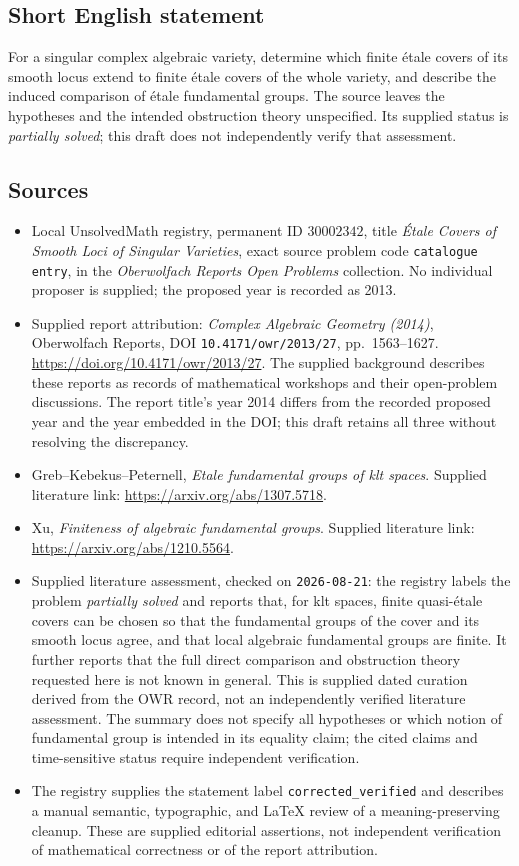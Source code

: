 \documentclass[11pt]{article}
\begin{document}
\subsection{Short English statement}
For a singular complex algebraic variety, determine which finite étale covers of its smooth locus extend to finite étale covers of the whole variety, and describe the induced comparison of étale fundamental groups. The source leaves the hypotheses and the intended obstruction theory unspecified. Its supplied status is \emph{partially solved}; this draft does not independently verify that assessment.
\subsection{Sources}
\begin{itemize}
\item Local UnsolvedMath registry, permanent ID \(30002342\), title \emph{Étale Covers of Smooth Loci of Singular Varieties}, exact source problem code \texttt{catalogue entry}, in the \emph{Oberwolfach Reports Open Problems} collection. No individual proposer is supplied; the proposed year is recorded as 2013.
\item Supplied report attribution: \emph{Complex Algebraic Geometry (2014)}, Oberwolfach Reports, DOI \texttt{10.4171/owr/2013/27}, pp.~1563--1627. \url{https://doi.org/10.4171/owr/2013/27}. The supplied background describes these reports as records of mathematical workshops and their open-problem discussions. The report title's year 2014 differs from the recorded proposed year and the year embedded in the DOI; this draft retains all three without resolving the discrepancy.
\item Greb--Kebekus--Peternell, \emph{Etale fundamental groups of klt spaces}. Supplied literature link: \url{https://arxiv.org/abs/1307.5718}.
\item Xu, \emph{Finiteness of algebraic fundamental groups}. Supplied literature link: \url{https://arxiv.org/abs/1210.5564}.
\item Supplied literature assessment, checked on \texttt{2026-08-21}: the registry labels the problem \emph{partially solved} and reports that, for klt spaces, finite quasi-étale covers can be chosen so that the fundamental groups of the cover and its smooth locus agree, and that local algebraic fundamental groups are finite. It further reports that the full direct comparison and obstruction theory requested here is not known in general. This is supplied dated curation derived from the OWR record, not an independently verified literature assessment. The summary does not specify all hypotheses or which notion of fundamental group is intended in its equality claim; the cited claims and time-sensitive status require independent verification.
\item The registry supplies the statement label \texttt{corrected\_verified} and describes a manual semantic, typographic, and LaTeX review of a meaning-preserving cleanup. These are supplied editorial assertions, not independent verification of mathematical correctness or of the report attribution.
\end{itemize}
\end{document}
